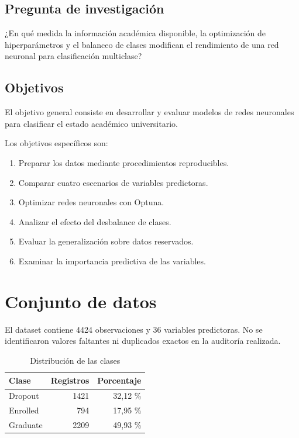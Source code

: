 \documentclass[11pt,a4paper]{article}
\begin{document}
\subsection{Pregunta de investigación}

¿En qué medida la información académica disponible,
la optimización de hiperparámetros y el balanceo
de clases modifican el rendimiento de una red neuronal
para clasificación multiclase?

\subsection{Objetivos}

El objetivo general consiste en desarrollar y
evaluar modelos de redes neuronales para
clasificar el estado académico universitario.

Los objetivos específicos son:
\begin{enumerate}
\item Preparar los datos mediante procedimientos reproducibles.
\item Comparar cuatro escenarios de variables predictoras.
\item Optimizar redes neuronales con Optuna.
\item Analizar el efecto del desbalance de clases.
\item Evaluar la generalización sobre datos reservados.
\item Examinar la importancia predictiva de las variables.
\end{enumerate}

\section{Conjunto de datos}

El dataset contiene 4424 observaciones y
36 variables predictoras.
No se identificaron valores faltantes ni
duplicados exactos en la auditoría realizada.

\begin{table}[H]
\centering
\caption{Distribución de las clases}
\begin{tabular}{lrr}
\toprule
Clase & Registros & Porcentaje \\
\midrule
Dropout & 1421 & 32,12 \% \\
Enrolled & 794 & 17,95 \% \\
Graduate & 2209 & 49,93 \% \\
\bottomrule
\end{tabular}
\end{table}
\end{document}
